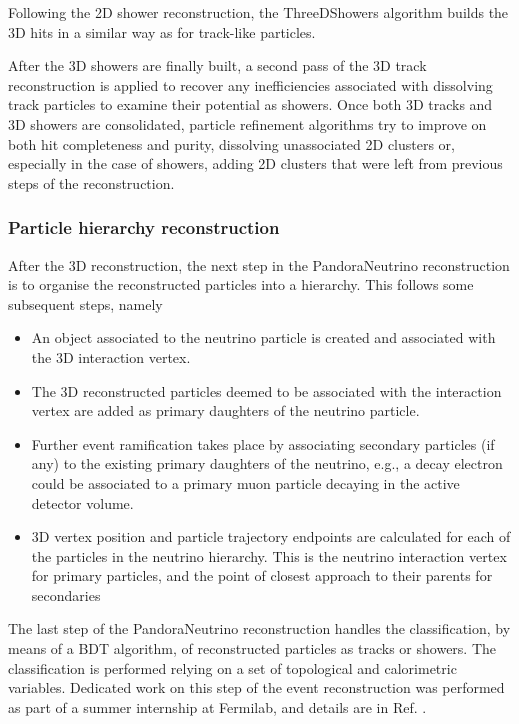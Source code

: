 Following the 2D shower reconstruction, the ThreeDShowers algorithm builds the 3D hits in a similar way as for track-like particles. 

After the 3D showers are finally built, a second pass of the 3D track reconstruction is applied to recover any inefficiencies associated with dissolving track particles to examine their potential as showers. Once both 3D tracks and 3D showers are consolidated, particle refinement algorithms try to improve on both hit completeness and purity, dissolving unassociated 2D clusters or, especially in the case of showers, adding 2D clusters that were left from previous steps of the reconstruction. 

\subsubsection{Particle hierarchy reconstruction}

After the 3D reconstruction, the next step in the PandoraNeutrino reconstruction is to organise the reconstructed particles into a hierarchy. This follows some subsequent steps, namely \begin{itemize}
    \item An object associated to the neutrino particle is created and associated with the 3D interaction vertex.
    \item The 3D reconstructed particles deemed to be associated with the interaction vertex are added as primary daughters of the neutrino particle.
    \item Further event ramification takes place by associating secondary particles (if any) to the existing primary daughters of the neutrino, e.g., a decay electron could be associated to a primary muon particle decaying in the active detector volume.
    \item 3D vertex position and particle trajectory endpoints are calculated for each of the particles in the neutrino hierarchy. This is the neutrino interaction vertex for primary particles, and the point of closest approach to their parents for secondaries
\end{itemize}

The last step of the PandoraNeutrino reconstruction handles the classification, by means of a BDT algorithm, of reconstructed particles as tracks or showers. The classification is performed relying on a set of topological and calorimetric variables. Dedicated work on this step of the event reconstruction was performed as part of a summer internship at Fermilab, and details are in Ref. \cite{Sotgia:2024d}. 

